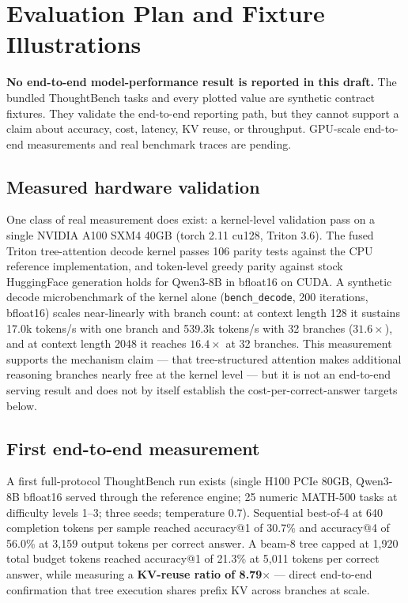 \section{Evaluation Plan and Fixture Illustrations}

\textbf{No end-to-end model-performance result is reported in this draft.}
The bundled ThoughtBench tasks and every plotted value are synthetic contract
fixtures.  They validate the end-to-end reporting path, but they cannot
support a claim about accuracy, cost, latency, KV reuse, or throughput.
GPU-scale end-to-end measurements and real benchmark traces are pending.

\subsection{Measured hardware validation}

One class of real measurement does exist: a kernel-level validation pass on a
single NVIDIA A100 SXM4 40GB (torch 2.11 cu128, Triton 3.6).  The fused
Triton tree-attention decode kernel passes 106 parity tests against the CPU
reference implementation, and token-level greedy parity against stock
HuggingFace generation holds for Qwen3-8B in bfloat16 on CUDA.  A synthetic
decode microbenchmark of the kernel alone (\texttt{bench\_decode}, 200
iterations, bfloat16) scales near-linearly with branch count: at context
length 128 it sustains 17.0k tokens/s with one branch and 539.3k tokens/s
with 32 branches ($31.6\times$), and at context length 2048 it reaches
$16.4\times$ at 32 branches.  This measurement supports the mechanism claim
--- that tree-structured attention makes additional reasoning branches nearly
free at the kernel level --- but it is not an end-to-end serving result and
does not by itself establish the cost-per-correct-answer targets below.

\subsection{First end-to-end measurement}

A first full-protocol ThoughtBench run exists (single H100 PCIe 80GB,
Qwen3-8B bfloat16 served through the reference engine; 25 numeric MATH-500
tasks at difficulty levels 1--3; three seeds; temperature 0.7).  Sequential
best-of-4 at 640 completion tokens per sample reached accuracy@1 of 30.7\%
and accuracy@4 of 56.0\% at 3{,}159 output tokens per correct answer.  A
beam-8 tree capped at 1{,}920 total budget tokens reached accuracy@1 of
21.3\% at 5{,}011 tokens per correct answer, while measuring a
\textbf{KV-reuse ratio of 8.79$\times$} --- direct end-to-end confirmation
that tree execution shares prefix KV across branches at scale.

